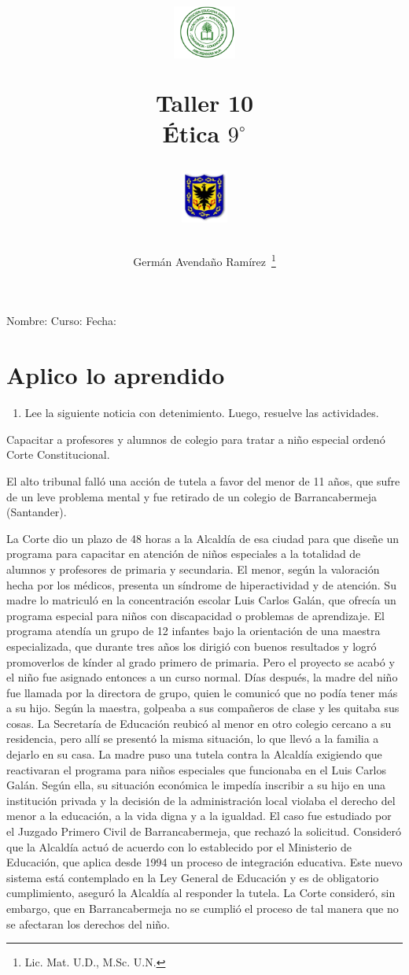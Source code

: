 \documentclass[10pt,twoside]{article}
\author{Germ\'an Avenda\~no Ram\'irez~\thanks{Lic. Mat. U.D., M.Sc. U.N.}}
\title{\begin{minipage}{.2\textwidth}
\includegraphics[height=1.75cm]{Images/logo-colegio.png}\end{minipage}
\begin{minipage}{.55\textwidth}
\begin{center}
Taller 10\\
Ética $9^{\circ}$
\end{center}
\end{minipage}\hfill
\begin{minipage}{.2\textwidth}
\includegraphics[height=1.75cm]{Images/logo-sed.png} 
\end{minipage}}
\date{}
\begin{document}
\maketitle
Nombre: \hrulefill Curso: \underline{\hspace*{44pt}} Fecha: \underline{\hspace*{2.5cm}}
\section*{Aplico lo aprendido}
\begin{enumerate}
\item Lee la siguiente noticia con detenimiento. Luego, resuelve las
actividades.
\end{enumerate}
Capacitar a profesores y alumnos de colegio para tratar a niño especial ordenó Corte Constitucional.

El alto tribunal falló una acción de tutela a favor del menor de 11 años, que sufre de un leve problema mental y fue retirado de un colegio de Barrancabermeja (Santander).

La Corte dio un plazo de 48 horas a la Alcaldía de esa ciudad
para que diseñe un programa para capacitar en atención de niños especiales a la totalidad de alumnos y profesores de primaria y secundaria. El menor, según la valoración hecha por los médicos, presenta un síndrome de hiperactividad y de atención. Su madre lo matriculó en la concentración escolar Luis Carlos Galán, que ofrecía un programa especial para niños con discapacidad o problemas de aprendizaje. El programa atendía un grupo de 12 infantes bajo la
orientación de una maestra especializada, que durante tres años los dirigió con buenos resultados y logró promoverlos de kínder al grado primero de primaria. Pero el proyecto se acabó y el niño fue asignado entonces a un curso normal. Días después, la madre del niño fue llamada por la directora de grupo, quien le comunicó que no podía tener más a su hijo. Según la maestra, golpeaba a sus compañeros de clase y les quitaba sus cosas. La Secretaría de Educación reubicó al menor en otro colegio cercano a su residencia, pero allí se presentó la misma situación, lo que llevó a la familia
a dejarlo en su casa. La madre puso una tutela contra la Alcaldía exigiendo que reactivaran el programa para niños especiales que funcionaba en el Luis Carlos Galán. Según ella, su situación económica le impedía inscribir a su hijo en una institución privada y la decisión de la administración local violaba el derecho del menor a la educación, a la vida digna y a la igualdad. El caso fue estudiado por el Juzgado Primero Civil de Barrancabermeja, que rechazó la solicitud. Consideró que la Alcaldía actuó de acuerdo con lo establecido por el Ministerio de Educación, que aplica desde 1994 un proceso de integración educativa. Este nuevo sistema está
contemplado en la Ley General de Educación y es de obligatorio cumplimiento, aseguró la Alcaldía al responder la tutela. La Corte consideró, sin embargo, que en Barrancabermeja no se cumplió el proceso de tal manera que no se afectaran los derechos del niño.
\end{document}
